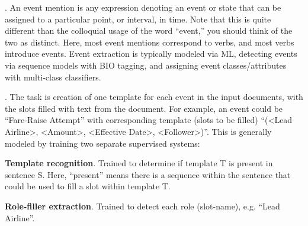 \documentclass[11pt]{article}
\newcommand\myspace[1][]{\vspace{#1\bigskipamount}}
\newcommand\p{\Needspace{10\baselineskip} \noindent}
\begin{document}
\myspace
\p {}. An event mention is any expression denoting an event or state that can be assigned to a particular point, or interval, in time. Note that this is quite different than the colloquial usage of the word ``event,'' you should think of the two as distinct. Here, most event mentions correspond to verbs, and most verbs introduce events. Event extraction is typically modeled via ML, detecting events via sequence models with BIO tagging, and assigning event classes/attributes with multi-class classifiers.

\myspace
\p {}. The task is creation of one template for each event in the input documents, with the slots filled with text from the document. For example, an event could be ``Fare-Raise Attempt'' with corresponding template (slots to be filled) ``(<Lead Airline>, <Amount>, <Effective Date>, <Follower>)''. This is generally modeled by training two separate supervised systems:
\begin{compactenum}
	\item \textbf{Template recognition}. Trained to determine if template T is present in sentence S. Here, ``present'' means there is a sequence within the sentence that could be used to fill a slot within template T.
	
	\item \textbf{Role-filler extraction}. Trained to detect each role (slot-name), e.g. ``Lead Airline''.
\end{compactenum}







\label{Probabilistic Graphical Models}




\newcommand{\sep}{\text{sep}_{\mathcal{H}}}
\newcommand{\Y}{\matr{Y}}
\renewcommand{\Z}{\matr{Z}}



\end{document}
